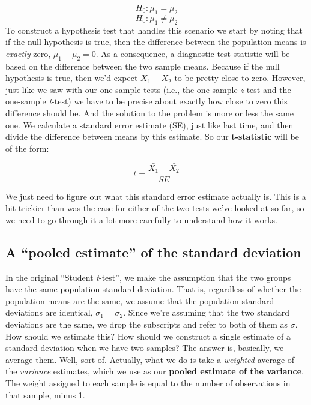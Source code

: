 \documentclass[
  a4paper,
]{book}
\begin{document}
\[H_0: \mu_1=\mu_2 \] \[H_0: \mu_1 \neq \mu_2 \] To construct a
hypothesis test that handles this scenario we start by noting that if
the null hypothesis is true, then the difference between the population
means is \emph{exactly} zero, \(\mu_1-\mu_2 = 0\). As a consequence, a
diagnostic test statistic will be based on the difference between the
two sample means. Because if the null hypothesis is true, then we'd
expect \(\bar{X}_1 - \bar{X}_2\) to be pretty close to zero. However,
just like we saw with our one-sample tests (i.e., the one-sample
\emph{z}-test and the one-sample \emph{t}-test) we have to be precise
about exactly how close to zero this difference should be. And the
solution to the problem is more or less the same one. We calculate a
standard error estimate (SE), just like last time, and then divide the
difference between means by this estimate. So our \textbf{t-statistic}
will be of the form:

\[t=\frac{\bar{X_1}-\bar{X_2}}{SE}\]

We just need to figure out what this standard error estimate actually
is. This is a bit trickier than was the case for either of the two tests
we've looked at so far, so we need to go through it a lot more carefully
to understand how it works.

\hypertarget{a-pooled-estimate-of-the-standard-deviation}{%
\subsection{A ``pooled estimate'' of the standard
deviation}\label{a-pooled-estimate-of-the-standard-deviation}}

In the original ``Student \emph{t}-test'', we make the assumption that
the two groups have the same population standard deviation. That is,
regardless of whether the population means are the same, we assume that
the population standard deviations are identical,
\(\sigma_1 = \sigma_2\). Since we're assuming that the two standard
deviations are the same, we drop the subscripts and refer to both of
them as \(\sigma\). How should we estimate this? How should we construct
a single estimate of a standard deviation when we have two samples? The
answer is, basically, we average them. Well, sort of. Actually, what we
do is take a \emph{weighted} average of the \emph{variance} estimates,
which we use as our \textbf{pooled estimate of the variance}. The weight
assigned to each sample is equal to the number of observations in that
sample, minus 1.
\end{document}
